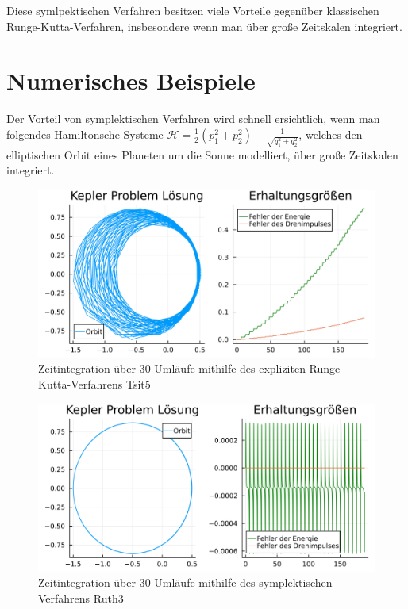 \documentclass{handout}
\begin{document}
Diese symlpektischen Verfahren besitzen viele Vorteile gegenüber klassischen Runge-Kutta-Verfahren, insbesondere wenn man über große Zeitskalen integriert. \cite{stackexchange} \cite{LectureODE}

\section{Numerisches Beispiele}
Der Vorteil von symplektischen Verfahren wird schnell ersichtlich, wenn man folgendes Hamiltonsche Systeme $\mathcal{H}=\frac{1}{2}\left(p_1^2+p_2^2\right)-\frac{1}{\sqrt{q_1^2+q_2^2}}$, welches den elliptischen Orbit eines Planeten um die Sonne modelliert, über große Zeitskalen integriert.

\begin{figure}[H]
    \centering
    \includegraphics[scale = 0.20]{Tsit5.png}
    \caption{Zeitintegration über 30 Umläufe mithilfe des expliziten Runge-Kutta-Verfahrens Tsit5\centering}
    \label{fig:Tsit5}
\end{figure}

\begin{figure}[H]
    \centering
    \includegraphics[scale = 0.20]{symp.png}
    \caption{Zeitintegration über 30 Umläufe mithilfe des symplektischen Verfahrens Ruth3\centering}
    \label{fig:symp}
\end{figure}
\end{document}
